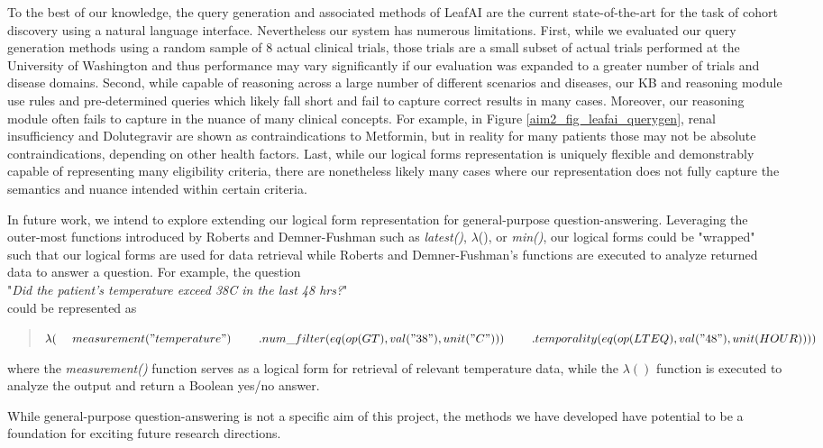 \documentclass[../main.tex]{subfiles}
\begin{document}
To the best of our knowledge, the query generation and associated methods of LeafAI are the current state-of-the-art for the task of cohort discovery using a natural language interface. Nevertheless our system has numerous limitations. First, while we evaluated our query generation methods using a random sample of 8 actual clinical trials, those trials are a small subset of actual trials performed at the University of Washington and thus performance may vary significantly if our evaluation was expanded to a greater number of trials and disease domains. Second, while capable of reasoning across a large number of different scenarios and diseases, our KB and reasoning module use rules and pre-determined queries which likely fall short and fail to capture correct results in many cases. Moreover, our reasoning module often fails to capture in the nuance of many clinical concepts. For example, in Figure \ref{aim2_fig_leafai_querygen}, renal insufficiency and Dolutegravir are shown as contraindications to Metformin, but in reality for many patients those may not be absolute contraindications, depending on other health factors. Last, while our logical forms representation is uniquely flexible and demonstrably capable of representing many eligibility criteria, there are nonetheless likely many cases where our representation does not fully capture the semantics and nuance intended within certain criteria.

In future work, we intend to explore extending our logical form representation for general-purpose question-answering. Leveraging the outer-most functions introduced by Roberts and Demner-Fushman such as \textit{latest()}, $\lambda$(), or \textit{min()}, our logical forms could be "wrapped" such that our logical forms are used for data retrieval while Roberts and Demner-Fushman's functions are executed to analyze returned data to answer a question. For example, the question \\

"\textit{Did the patient’s temperature exceed 38C in the last 48 hrs?}" \\

\noindent could be represented as

\begin{quote}
$\lambda( \\
    \mathrm{\ \ \ \ }measurement("temperature") \\
    \mathrm{\ \ \ \ \ \ \ }.num\_filter(eq(op(GT), val("38"), unit("C")))\\
    \mathrm{\ \ \ \ \ \ \ }.temporality(eq(op(LTEQ), val("48"), unit(HOUR))) \\
)$
\end{quote}

\noindent where the \textit{measurement()} function serves as a logical form for retrieval of relevant temperature data, while the $\lambda()$ function is executed to analyze the output and return a Boolean yes/no answer.

While general-purpose question-answering is not a specific aim of this project, the methods we have developed have potential to be a foundation for exciting future research directions. 
\end{document}
